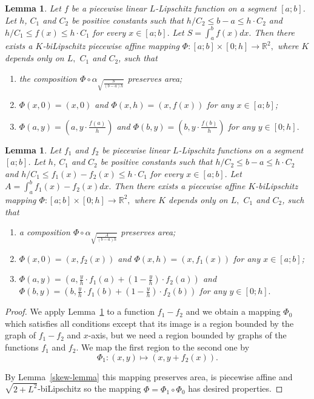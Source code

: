 \documentclass[12pt]{article}
\newtheorem{lemm}[prop]{Lemma}
\theoremstyle{definition}
\begin{document}
\begin{lemm}
\label{square-to-graph}
Let $f$ be a piecewise linear $L$-Lipschitz function on a segment $[a; b]$. Let $h$, $C_1$ and $C_2$ be positive constants such that $h/C_2\le b-a \le h\cdot C_2$ and $h/C_1 \le f(x)\le h\cdot C_1$ for every $x\in[a;b].$ Let $S = \int_a^b f(x) dx.$ Then there exists a $K$-biLipschitz piecewise affine mapping $\Phi: [a;b]\times [0;h] \to \mathbb R^2,$ where $K$ depends only on $L,$ $C_1$ and $C_2$, such that
\begin{enumerate}[label = \arabic*),ref = \arabic*)]
\item
the composition $\Phi\circ\alpha_{\sqrt{\frac{S}{(b-a)h}}}$ preserves area;
\item
$\Phi(x, 0) = (x, 0)$ and $\Phi(x, h) = (x, f(x))$ for any $x\in[a;b]$;
\item
$\Phi(a, y) = \left(a, y\cdot\frac{f(a)}{h}\right)$ and $\Phi(b, y) = \left(b, y\cdot\frac{f(b)}{h}\right)$ for any $y\in[0;h].$
\end{enumerate}
\end{lemm}

\begin{lemm}
\label{square-to-graph2}
Let $f_1$ and $f_2$ be piecewise linear $L$-Lipschitz functions on a segment $[a; b]$. Let $h$, $C_1$ and $C_2$ be positive constants such that $h/C_2\le b-a \le h\cdot C_2$ and $h/C_1 \le f_1(x) - f_2(x)\le h\cdot C_1$ for every $x\in[a;b].$ Let $A = \int_a^b f_1(x) - f_2(x) dx.$ Then there exists a piecewise affine $K$-biLipschitz mapping $\Phi: [a;b]\times [0;h] \to \mathbb R^2,$ where $K$ depends only on $L,$ $C_1$ and $C_2$, such that
\begin{enumerate}[label = \arabic*),ref = \arabic*)]
\item
a composition $\Phi\circ\alpha_{\sqrt{\frac{A}{(b-a)h}}}$ preserves area;
\item
$\Phi(x, 0) = (x, f_2(x))$ and $\Phi(x, h) = (x, f_1(x))$ for any $x\in[a;b]$;
\item
$\Phi(a, y) = \left(a, \frac{y}{h}\cdot f_1(a) + \left(1-\frac{y}{h}\right)\cdot f_2(a)\right)$ and $\Phi(b, y) = \left(b, \frac{y}{h}\cdot f_1(b) + \left(1-\frac{y}{h}\right)\cdot f_2(b)\right)$ for any $y\in[0;h].$
\end{enumerate}
\end{lemm}

\begin{proof}
We apply Lemma~\ref{square-to-graph} to a function $f_1 - f_2$ and we obtain a mapping $\Phi_0$ which satisfies all conditions except that its image is a region bounded by the graph of $f_1 - f_2$ and $x$-axis, but we need a region bounded by graphs of the functions $f_1$ and $f_2.$ We map the first region to the second one by
$$
\Phi_1: (x,y) \mapsto (x, y + f_2(x)).
$$

By Lemma~\ref{skew-lemma} this mapping preserves area, is piecewise affine and $\sqrt{2+L^2}$-biLipschitz so the mapping $\Phi = \Phi_1\circ\Phi_0$ has desired properties.

\end{proof}
\end{document}
